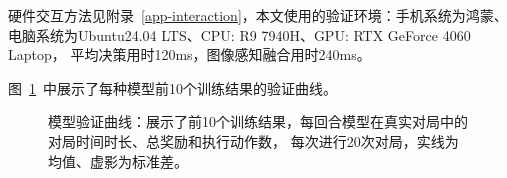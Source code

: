 硬件交互方法见附录~\ref{app-interaction}，本文使用的验证环境：手机系统为鸿蒙、电脑系统为Ubuntu24.04 LTS、CPU: R9 7940H、GPU: RTX GeForce 4060 Laptop，
平均决策用时120ms，图像感知融合用时240ms。

图~\ref{fig-model-eval}~中展示了每种模型前10个训练结果的验证曲线。

\begin{figure}[h!]
  \centering
  \setlength{\abovecaptionskip}{0ex}  %
  \caption{模型验证曲线：展示了前10个训练结果，每回合模型在真实对局中的对局时间时长、总奖励和执行动作数，
  每次进行20次对局，实线为均值、虚影为标准差。}\label{fig-model-eval}
\end{figure}
